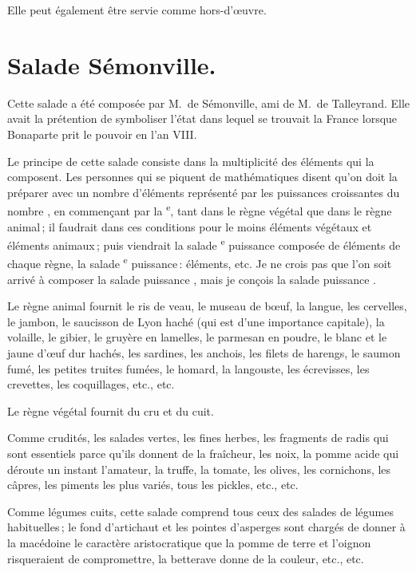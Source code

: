 \medskip

Elle peut également être servie comme hors-d'œuvre.

\section*{\centering Salade Sémonville.}
{}

Cette salade a été composée par M. de Sémonville, ami de M. de Talleyrand. Elle
avait la prétention de symboliser l'état dans lequel se trouvait la France
lorsque Bonaparte prit le pouvoir en l'an VIII.

Le principe de cette salade consiste dans la multiplicité des éléments qui la
composent. Les personnes qui se piquent de mathématiques disent qu'on doit la
préparer avec un nombre d'éléments représenté par les puissances croissantes du
nombre {\mmm}, en commençant par la {\mmm}\textsuperscript{e}, tant
dans le règne végétal que dans le règne animal ; il faudrait dans ces
conditions pour le moins {\mmm} éléments végétaux et {\mmm} éléments
animaux ; puis viendrait la salade {\mmm}\textsuperscript{e} puissance
composée de {\mmm} éléments de chaque règne, la salade
{\mmm}\textsuperscript{e} puissance : {\mmm} éléments, etc. Je ne
crois pas que l'on soit arrivé à composer la salade puissance {\mmm}, mais
je conçois la salade puissance {\mmm}.

Le règne animal fournit le ris de veau, le museau de bœuf, la langue, les
cervelles, le jambon, le saucisson de Lyon haché (qui est d'une importance
capitale), la volaille, le gibier, le gruyère en lamelles, le parmesan en
poudre, le blanc et le jaune d'œuf dur hachés, les sardines, les anchois, les
filets de harengs, le saumon fumé, les petites truites fumées, le homard, la
langouste, les écrevisses, les crevettes, les coquillages, etc., etc.

Le règne végétal fournit du cru et du cuit.

Comme crudités, les salades vertes, les fines herbes, les fragments de radis
qui sont essentiels parce qu'ils donnent de la fraîcheur, les noix, la pomme
acide qui déroute un instant l'amateur, la truffe, la tomate, les olives, les
cornichons, les câpres, les piments les plus variés, tous les pickles, etc.,
etc.

Comme légumes cuits, cette salade comprend tous ceux des salades de légumes
habituelles ; le fond d’artichaut et les pointes d'asperges sont chargés de
donner à la macédoine le caractère aristocratique que la pomme de terre et
l'oignon risqueraient de compromettre, la betterave donne de la couleur, etc.,
etc.

